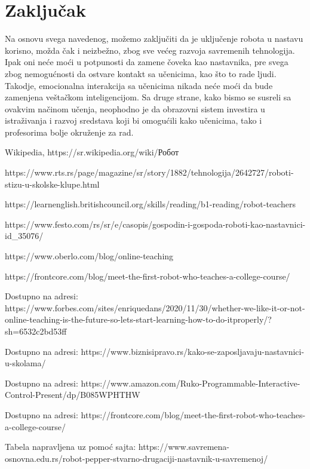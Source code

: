 \documentclass[a4paper]{article}
\begin{document}
\section{Zaključak}
\label{sec:zakljucak}

Na osnovu svega navedenog, možemo zaključiti da je uključenje robota u nastavu korisno, možda čak i neizbežno, zbog sve većeg razvoja savremenih tehnologija. Ipak oni neće moći u potpunosti da zamene čoveka kao nastavnika, pre svega zbog nemogućnosti da ostvare kontakt sa učenicima, kao što to rade ljudi. Takodje, emocionalna interakcija sa učenicima nikada neće moći da bude zamenjena veštačkom inteligencijom. Sa druge strane, kako bismo se susreli sa ovakvim načinom učenja, neophodno je da obrazovni sistem investira u istraživanja i razvoj sredstava koji bi omogućili kako učenicima, tako i profesorima bolje okruženje za rad.

\newpage
{}
\appendix

\begin{thebibliography}{9}

\bibitem{}Wikipedia, https://sr.wikipedia.org/wiki/Робот

\bibitem{}https://www.rts.rs/page/magazine/sr/story/1882/tehnologija/2642727/roboti-stizu-u-skolske-klupe.html

\bibitem{}https://learnenglish.britishcouncil.org/skills/reading/b1-reading/robot-teachers

\bibitem{}https://www.festo.com/rs/sr/e/casopis/gospodin-i-gospoda-roboti-kao-nastavnici-id\_35076/

\bibitem{}https://www.oberlo.com/blog/online-teaching

\bibitem{}https://frontcore.com/blog/meet-the-first-robot-who-teaches-a-college-course/

Dostupno na adresi: 
https://www.forbes.com/sites/enriquedans/2020/11/30/whether-we-like-it-or-not-online-teaching-is-the-future-so-lets-start-learning-how-to-do-itproperly/?sh=6532c2bd53ff

Dostupno na adresi: https://www.biznisipravo.rs/kako-se-zaposljavaju-nastavnici-u-skolama/

Dostupno na adresi: https://www.amazon.com/Ruko-Programmable-Interactive-Control-Present/dp/B085WPHTHW

 Dostupno na adresi: https://frontcore.com/blog/meet-the-first-robot-who-teaches-a-college-course/

Tabela napravljena uz pomoć sajta: https://www.savremena-osnovna.edu.rs/robot-pepper-stvarno-drugaciji-nastavnik-u-savremenoj/

\end{thebibliography}
\end{document}
